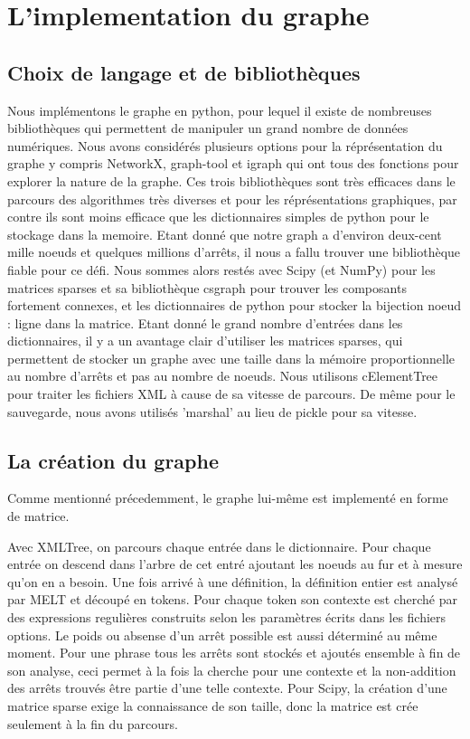 \section{L'implementation du graphe}

\subsection{Choix de langage et de bibliothèques}

Nous implémentons le graphe en python, pour lequel il existe de nombreuses 
bibliothèques qui permettent de manipuler un grand 
nombre de données numériques. Nous avons considérés plusieurs options pour
la réprésentation du graphe y compris NetworkX, graph-tool et igraph qui
ont tous des fonctions pour explorer la nature de la graphe. Ces trois
bibliothèques sont très efficaces dans le parcours des algorithmes très
diverses et pour les réprésentations graphiques, par contre
ils sont moins efficace que les dictionnaires
simples de python pour le stockage dans la memoire.
Etant donné que notre graph a d'environ deux-cent mille noeuds et quelques millions d'arrêts,
il nous a fallu trouver une bibliothèque fiable pour ce défi.
Nous sommes alors restés avec Scipy (et NumPy) pour les matrices sparses et sa
bibliothèque csgraph pour trouver les composants fortement connexes, et
les dictionnaires de python pour stocker la bijection noeud : ligne dans
la matrice. Etant donné le grand nombre d'entrées dans les dictionnaires, il y a un 
avantage clair d'utiliser les matrices sparses, qui permettent de stocker
un graphe avec une taille dans la mémoire proportionnelle au nombre d'arrêts
et pas au nombre de noeuds.
Nous utilisons cElementTree pour traiter les 
fichiers XML à cause de sa vitesse de parcours.
De même pour le sauvegarde, nous avons utilisés 'marshal' au lieu de pickle pour sa
vitesse.


\subsection{La création du graphe}
Comme mentionné précedemment, le graphe lui-même est implementé en forme de 
matrice.

Avec XMLTree, on parcours chaque entrée dans le dictionnaire. Pour chaque entrée on descend
dans l'arbre de cet entré ajoutant les noeuds au fur et à mesure qu'on en a besoin.
Une fois arrivé à une définition, la définition entier est analysé par MELT et découpé en
tokens. Pour chaque token son contexte est cherché par des expressions regulières construits
selon les paramètres écrits dans les fichiers options. Le poids ou absense d'un arrêt possible est
aussi déterminé au même moment. Pour une phrase tous les arrêts sont stockés et ajoutés ensemble
à fin de son analyse, ceci permet à la fois la cherche pour une contexte et la non-addition
des arrêts trouvés être partie d'une telle contexte. Pour Scipy, la création d'une matrice
sparse exige la connaissance de son taille, donc la matrice est crée seulement à la fin
du parcours.

